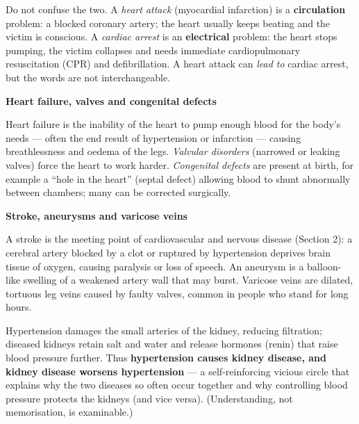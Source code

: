 \documentclass[11pt]{article}
\newcommand{\cle}[1]{{\popxbold\color{popdark}#1}}
\begin{document}
\begin{attention}
Do not confuse the two. A \emph{heart attack} (myocardial infarction) is a \textbf{circulation} problem: a blocked coronary artery; the heart usually keeps beating and the victim is conscious. A \emph{cardiac arrest} is an \textbf{electrical} problem: the heart stops pumping, the victim collapses and needs immediate cardiopulmonary resuscitation (CPR) and defibrillation. A heart attack can \emph{lead to} cardiac arrest, but the words are not interchangeable.
\end{attention}

\textbf{Heart failure, valves and congenital defects}\par
\cle{Heart failure} is the inability of the heart to pump enough blood for the body's needs — often the end result of hypertension or infarction — causing breathlessness and oedema of the legs. \emph{Valvular disorders} (narrowed or leaking valves) force the heart to work harder. \emph{Congenital defects} are present at birth, for example a ``hole in the heart'' (septal defect) allowing blood to shunt abnormally between chambers; many can be corrected surgically.

\textbf{Stroke, aneurysms and varicose veins}\par
A \cle{stroke} is the meeting point of cardiovascular and nervous disease (Section 2): a cerebral artery blocked by a clot or ruptured by hypertension deprives brain tissue of oxygen, causing paralysis or loss of speech. An \cle{aneurysm} is a balloon-like swelling of a weakened artery wall that may burst. \cle{Varicose veins} are dilated, tortuous leg veins caused by faulty valves, common in people who stand for long hours.

\begin{propriete}
Hypertension damages the small arteries of the kidney, reducing filtration; diseased kidneys retain salt and water and release hormones (renin) that raise blood pressure further. Thus \textbf{hypertension causes kidney disease, and kidney disease worsens hypertension} — a self-reinforcing vicious circle that explains why the two diseases so often occur together and why controlling blood pressure protects the kidneys (and vice versa). (Understanding, not memorisation, is examinable.)
\end{propriete}
\end{document}
